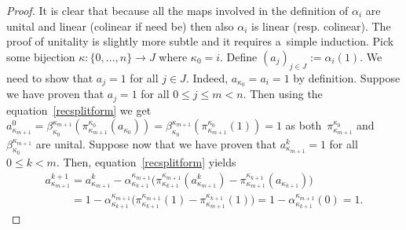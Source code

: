 \documentclass[11pt]{article}
\begin{document}
\begin{proof}
It is clear that because all the maps involved in the def\/inition of $\alpha_i$ are unital and linear (colinear if need
be) then also $\alpha_i$ is linear (resp.
colinear).
The proof of unitality is slightly more subtle and it requires a~simple induction.
Pick some bijection $\kappa:\{0,\ldots,n\}\rightarrow J$ where $\kappa_0=i$.
Def\/ine $(a_j)_{j\in J}:=\alpha_i(1)$.
We need to show that $a_j=1$ for all $j\in J$.
Indeed, $a_{\kappa_0}=a_i=1$ by def\/inition.
Suppose we have proven that $a_j=1$ for all $0\leq j\leq m<n$.
Then using the equation~\eqref{recsplitform} we get
$a^0_{\kappa_{m+1}}=\beta^{\kappa_{m+1}}_{\kappa_0}(\pi^{\kappa_0}_{\kappa_{m+1}}(a_{\kappa_0}))=
\beta^{\kappa_{m+1}}_{\kappa_0}(\pi^{\kappa_0}_{\kappa_{m+1}}(1))=1$ as both~$\pi^{\kappa_0}_{\kappa_{m+1}}$ and~$\beta^{\kappa_{m+1}}_{\kappa_0}$ are unital.
Suppose now that we have proven that $a^k_{\kappa_{m+1}}=1$ for all $0\leq k<m$.
Then, equation~\eqref{recsplitform} yields
\begin{gather*}
a^{k+1}_{\kappa_{m+1}}
=a_{\kappa_{m+1}}^k-\alpha^{\kappa_{m+1}}_{\kappa_{k+1}}
\big(\pi^{\kappa_{m+1}}_{\kappa_{k+1}}(a^k_{\kappa_{m+1}})-\pi^{\kappa_{k+1}}_{\kappa_{m+1}}(a_{\kappa_{k+1}})\big)
\\
\phantom{a^{k+1}_{\kappa_{m+1}}}
 =1 -\alpha^{\kappa_{m+1}}_{\kappa_{k+1}}\big(\pi^{\kappa_{m+1}}_{\kappa_{k+1}}(1)-\pi^{\kappa_{k+1}}_{\kappa_{m+1}}(1)\big)
 =1-\alpha^{\kappa_{m+1}}_{\kappa_{k+1}}(0)
 =1.
\end{gather*}


\end{proof}
\end{document}
